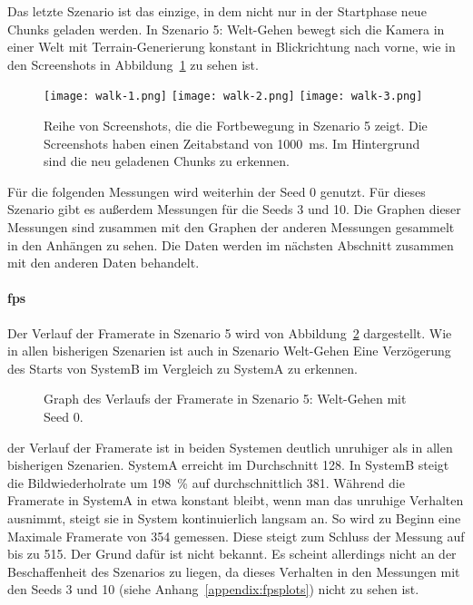 Das letzte Szenario ist das einzige, in dem nicht nur in der Startphase neue Chunks geladen werden. In Szenario 5: Welt-Gehen bewegt sich die Kamera in einer Welt mit Terrain-Generierung konstant in Blickrichtung nach vorne, wie in den Screenshots in Abbildung~\ref{fig:walk} zu sehen ist.
\begin{figure}[!htbp]
	\centering
	\texttt{[image: walk-1.png]}
	\texttt{[image: walk-2.png]}
	\texttt{[image: walk-3.png]}
	\caption[Reihe von Screenshots, die die Fortbewegung in Szenario 5 zeigt.]{Reihe von Screenshots, die die Fortbewegung in Szenario 5 zeigt. Die Screenshots haben einen Zeitabstand von \SI{1000}{\milli\second}. Im Hintergrund sind die neu geladenen Chunks zu erkennen.}\label{fig:walk}
\end{figure}

Für die folgenden Messungen wird weiterhin der Seed 0 genutzt. Für dieses Szenario gibt es außerdem Messungen für die Seeds 3 und 10. Die Graphen dieser Messungen sind zusammen mit den Graphen der anderen Messungen gesammelt in den Anhängen zu sehen. Die Daten werden im nächsten Abschnitt zusammen mit den anderen Daten behandelt.

\paragraph{\ac{fps}}
Der Verlauf der Framerate in Szenario 5 wird von Abbildung~\ref{fig:seed-0-walk-fps} dargestellt. Wie in allen bisherigen Szenarien ist auch in Szenario Welt-Gehen Eine Verzögerung des Starts von SystemB im Vergleich zu SystemA zu erkennen.
\begin{figure}[!htbp]
	\caption{Graph des Verlaufs der Framerate in Szenario 5: Welt-Gehen mit Seed 0.}\label{fig:seed-0-walk-fps}
\end{figure}
der Verlauf der Framerate ist in beiden Systemen deutlich unruhiger als in allen bisherigen Szenarien. SystemA erreicht im Durchschnitt \SI{128}{\fps}. In SystemB steigt die Bildwiederholrate um \SI{198}{\percent} auf durchschnittlich \SI{381}{\fps}. Während die Framerate in SystemA in etwa konstant bleibt, wenn man das unruhige Verhalten ausnimmt, steigt sie in System kontinuierlich langsam an. So wird zu Beginn eine Maximale Framerate von \SI{354}{\fps} gemessen. Diese steigt zum Schluss der Messung auf bis zu \SI{515}{\fps}. Der Grund dafür ist nicht bekannt. Es scheint allerdings nicht an der Beschaffenheit des Szenarios zu liegen, da dieses Verhalten in den Messungen mit den Seeds 3 und 10 (siehe Anhang~\vref{appendix:fpsplots}) nicht zu sehen ist.

